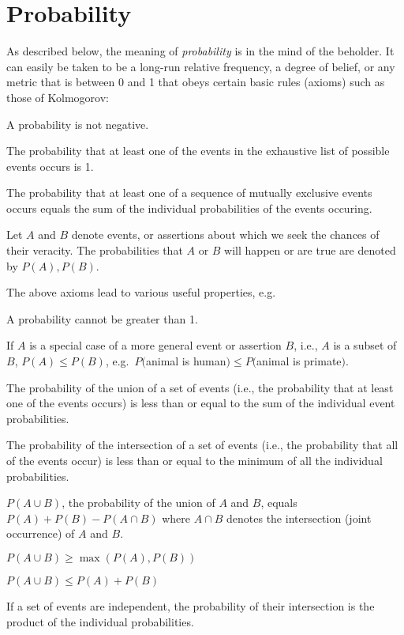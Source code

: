 \section{Probability}\label{sec:prob}
As described below, the meaning of \emph{probability} is in the mind
of the beholder.  It can easily be taken to be a long-run relative
frequency, a degree of belief, or any metric that is between 0 and 1
that obeys certain basic rules (axioms) such as those of Kolmogorov:
\be
\item A probability is not negative.
\item The probability that at least one of the events in the exhaustive list of
  possible events occurs is 1.
\item The probability that at least one of a sequence of mutually
  exclusive events occurs equals the sum of the individual
  probabilities of the events occuring.
\ee

Let $A$ and $B$ denote events, or assertions about which we seek the
chances of their veracity.  The probabilities that $A$ or $B$ will
happen or are true are denoted by $P(A), P(B)$.

The above axioms lead to various useful properties, e.g.
\be
\item A probability cannot be greater than 1.
\item If $A$ is a special case of a more general
  event or assertion $B$, i.e., $A$ is a subset of $B$, $P(A) \leq
  P(B)$, e.g.\ $P($animal is human$) \leq P($animal is primate$)$.
\item The probability of the union of a set of events (i.e., the
  probability that at least one of the events occurs) is less than or
  equal to the sum of the individual event probabilities.
\item The probability of the intersection of a set of events (i.e.,
  the probability that all of the events occur) is less than or
  equal to the minimum of all the individual probabilities.
\item $P(A \cup B)$, the probability of the union of $A$ and $B$,
  equals $P(A) + P(B) - P(A \cap B)$ where $A \cap B$ denotes the
  intersection (joint occurrence) of $A$ and $B$.
\item $P(A \cup B) \geq \max(P(A), P(B))$
\item $P(A \cup B) \leq P(A) + P(B)$
\item If a set of events are independent, the probability of their
  intersection is the product of the individual probabilities.
\ee

